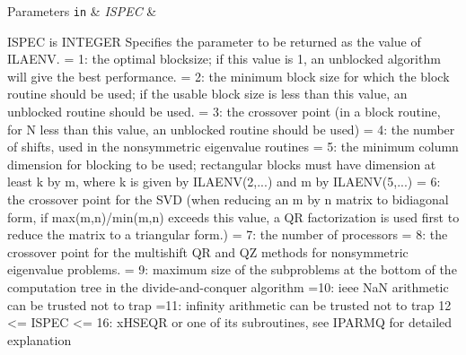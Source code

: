 \begin{DoxyParams}[1]{Parameters}
\mbox{\tt in}  & {\em I\+S\+P\+E\+C} & \begin{DoxyVerb}          ISPEC is INTEGER
          Specifies the parameter to be returned as the value of
          ILAENV.
          = 1: the optimal blocksize; if this value is 1, an unblocked
               algorithm will give the best performance.
          = 2: the minimum block size for which the block routine
               should be used; if the usable block size is less than
               this value, an unblocked routine should be used.
          = 3: the crossover point (in a block routine, for N less
               than this value, an unblocked routine should be used)
          = 4: the number of shifts, used in the nonsymmetric
               eigenvalue routines
          = 5: the minimum column dimension for blocking to be used;
               rectangular blocks must have dimension at least k by m,
               where k is given by ILAENV(2,...) and m by ILAENV(5,...)
          = 6: the crossover point for the SVD (when reducing an m by n
               matrix to bidiagonal form, if max(m,n)/min(m,n) exceeds
               this value, a QR factorization is used first to reduce
               the matrix to a triangular form.)
          = 7: the number of processors
          = 8: the crossover point for the multishift QR and QZ methods
               for nonsymmetric eigenvalue problems.
          = 9: maximum size of the subproblems at the bottom of the
               computation tree in the divide-and-conquer algorithm
          =10: ieee NaN arithmetic can be trusted not to trap
          =11: infinity arithmetic can be trusted not to trap
          12 <= ISPEC <= 16:
               xHSEQR or one of its subroutines,
               see IPARMQ for detailed explanation


\end{DoxyVerb}
\end{DoxyParams}
